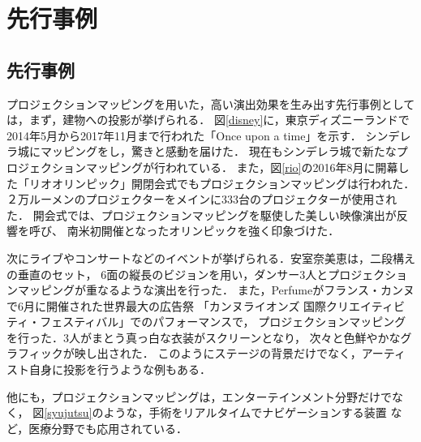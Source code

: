 \chapter{先行事例}
\thispagestyle{fancy}

\section{先行事例}
プロジェクションマッピングを用いた，高い演出効果を生み出す先行事例としては，まず，建物への投影が挙げられる．
図\ref{disney}に，東京ディズニーランドで2014年5月から2017年11月まで行われた「Once upon a time」を示す．%
シンデレラ城にマッピングをし，驚きと感動を届けた．
現在もシンデレラ城で新たなプロジェクションマッピングが行われている\cite{once}．
また，図\ref{rio}の2016年8月に開幕した「リオオリンピック」開閉会式でもプロジェクションマッピングは行われた． 
２万ルーメンのプロジェクターをメインに333台のプロジェクターが使用された．
開会式では、プロジェクションマッピングを駆使した美しい映像演出が反響を呼び、
南米初開催となったオリンピックを強く印象づけた\cite{olympic}．

次にライブやコンサートなどのイベントが挙げられる．安室奈美恵は，二段構えの垂直のセット，
6面の縦長のビジョンを用い，ダンサー3人とプロジェクションマッピングが重なるような演出を行った\cite{amuro}．
また，Perfumeがフランス・カンヌで6月に開催された世界最大の広告祭
「カンヌライオンズ 国際クリエイティビティ・フェスティバル」でのパフォーマンスで，
プロジェクションマッピングを行った．3人がまとう真っ白な衣装がスクリーンとなり，
次々と色鮮やかなグラフィックが映し出された．
このようにステージの背景だけでなく，アーティスト自身に投影を行うような例もある．

他にも，プロジェクションマッピングは，エンターテインメント分野だけでなく，
図\ref{syujutsu}のような，手術をリアルタイムでナビゲーションする装置%
など，医療分野でも応用されている．


\clearpage

